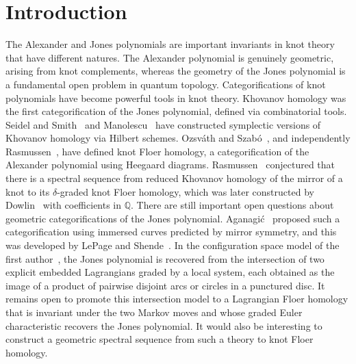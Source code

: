 \documentclass[11pt]{amsart}
\numberwithin{equation}{section}
\numberwithin{figure}{section}
\theoremstyle{definition}
\newcommand{\bQ}{\mathbb{Q}}
\begin{document}
\section{Introduction}\label{introduction}
The Alexander and Jones polynomials are important invariants in knot theory that have different natures. The Alexander polynomial is genuinely geometric, arising from knot complements, whereas the geometry of the Jones polynomial is a fundamental open problem in quantum topology. Categorifications of knot polynomials have become powerful tools in knot theory. Khovanov homology was the first categorification of the Jones polynomial, defined via combinatorial tools. Seidel and Smith~\cite{seidel-smith} and Manolescu~\cite{manolescu} have constructed symplectic versions of Khovanov homology via Hilbert schemes. Ozsv{\'a}th and Szab{\'o}~\cite{OS2}, and independently Rasmussen~\cite{Rass}, have defined knot Floer homology, a categorification of the Alexander polynomial using Heegaard diagrams. Rasmussen~\cite{Rass} conjectured that there is a spectral sequence from reduced Khovanov homology of the mirror of a knot to its $\delta$-graded knot Floer homology, which was later constructed by Dowlin~\cite{Dow} with coefficients in $\bQ$. There are still important open questions about geometric categorifications of the Jones polynomial. Aganagi\'c~\cite{Ag, Ag2} proposed such a categorification using immersed curves predicted by mirror symmetry, and this was developed by LePage and Shende~\cite{LePageShende}. In the configuration space model of the first author~\cite{Anghel-cjp, Anghel2023TAMS}, the Jones polynomial is recovered from the intersection of two explicit embedded Lagrangians graded by a local system, each obtained as the image of a product of pairwise disjoint arcs or circles in a punctured disc. It remains open to promote this intersection model to a Lagrangian Floer homology that is invariant under the two Markov moves and whose graded Euler characteristic recovers the Jones polynomial. It would also be interesting to construct a geometric spectral sequence from such a theory to knot Floer homology.
\end{document}
